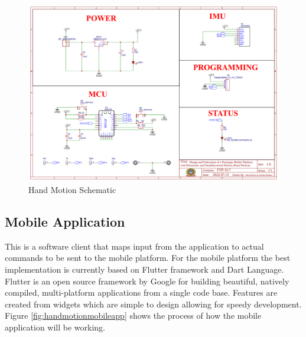 \begin{figure}[H]
    \centering
    \includegraphics[scale=0.4]{Figures/HMSchematic.png}
    \caption{Hand Motion Schematic}
    \label{fig:handmotionschematic}
\end{figure}

\subsection{Mobile Application}

This is a software client that maps input from the application to actual commands to be sent to the mobile platform. For the mobile platform the best implementation is currently based on Flutter framework and Dart Language. Flutter is an open source framework by Google for building beautiful, natively compiled, multi-platform applications from a single code base. Features are created from widgets which are simple to design allowing for speedy development.
Figure \ref{fig:handmotionmobileapp} shows the process of how the mobile application will be working.

